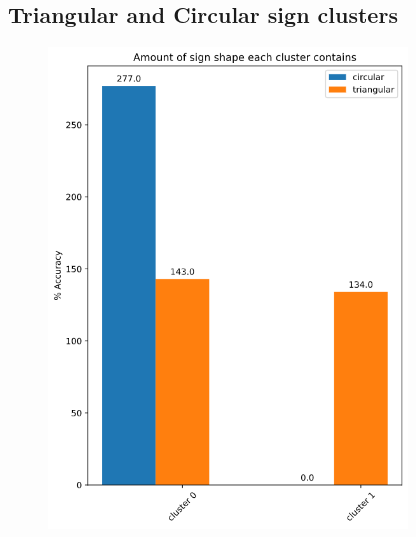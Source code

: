 \documentclass[11pt]{article}
\begin{document}
\begin{appendices}
\subsection{Triangular and Circular sign clusters}\label{TrianCircCluster1} 
\begin{figure}[h!]
  \includegraphics[width=0.85\textwidth]{Images/TriangularCircularClusterBarChart.png}
\end{figure}

\newpage

\end{appendices}
\end{document}
